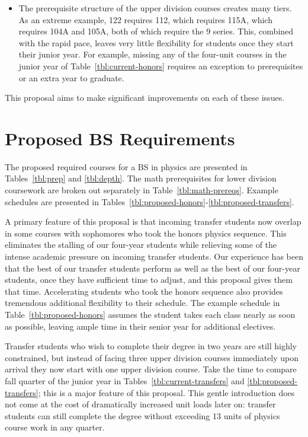 \documentclass[12pt]{article}
\begin{document}
\begin{itemize}
\item The prerequisite structure of the upper division courses creates
  many tiers.  As an extreme example, 122 requires 112, which requires
  115A, which requires 104A and 105A, both of which require the 9
  series.  This, combined with the rapid pace, leaves very little
  flexibility for students once they start their junior year.  For
  example, missing any of the four-unit courses in the junior year of
  Table~\ref{tbl:current-honors} requires an exception to
  prerequisites or an extra year to graduate.
\end{itemize}
This proposal aims to make significant improvements on each of these issues.

\newpage

\section{Proposed BS Requirements}

The proposed required courses for a BS in physics are presented in
Tables~\ref{tbl:prep} and \ref{tbl:depth}.  The math prerequisites for
lower division coursework are broken out separately in
Table~\ref{tbl:math-prereqs}.  Example schedules are presented in
Tables~\ref{tbl:proposed-honors}-\ref{tbl:proposed-transfers}.

A primary feature of this proposal is that incoming transfer students
now overlap in some courses with sophomores who took the honors
physics sequence.  This eliminates the stalling of our four-year
students while relieving some of the intense academic pressure on
incoming transfer students.  Our experience has been that the best of
our transfer students perform as well as the best of our four-year
students, once they have sufficient time to adjust, and this proposal
gives them that time.  Accelerating students who took the honors
sequence also provides tremendous additional flexibility to their
schedule.  The example schedule in Table~\ref{tbl:proposed-honors}
assumes the student takes each class nearly as soon as possible,
leaving ample time in their senior year for additional electives.

Transfer students who wish to complete their degree in two years are
still highly constrained, but instead of facing three upper division
courses immediately upon arrival they now start with one upper
division course.  Take the time to compare fall quarter of the junior
year in Tables~\ref{tbl:current-transfers} and
\ref{tbl:proposed-transfers}; this is a major feature of this
proposal.  This gentle introduction does not come at the cost of
dramatically increased unit loads later on: transfer students can
still complete the degree without exceeding 13 units of physics
course work in any quarter.
\end{document}
